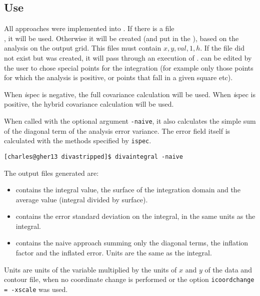 \subsection{Use}

All approaches were implemented into . If there is a file\\ 
, it will be used.
Otherwise it will be created (and put in the ), based on the analysis on the output grid. This files must contain $x,y,val,1,h$. If the file did not exist but was created, it will pass through an execution of . 
 can be edited by the user to chose special points for the integration (for example only those points for which the analysis is positive, or points that fall in a given square etc). 

When {\textit ispec } is negative, the full covariance calculation will be used. When {\textit ispec } is positive, the hybrid covariance calculation will be used.

When called with the optional argument \texttt{-naive}, it also calculates the simple sum of the diagonal term of the analysis error variance. The error field itself is calculated with the methods specified by \texttt{ispec}. 

\begin{lstlisting}[style=Bash]
[charles@gher13 divastripped]$ divaintegral -naive
\end{lstlisting}

The output files generated are:
\begin{itemize}
\item {} contains the integral value, the surface of the integration domain and the average value (integral divided by surface).
\item {} contains the error standard deviation on the integral, in the same units as the integral.
\item {} contains the naive approach summing only the diagonal terms, the inflation factor and the inflated error. Units are the same as the integral.
\end{itemize}

Units are units of the variable multiplied by the units of $x$ and $y$ of the data and contour file, when no coordinate change is performed or the option {\tt icoordchange = -xscale} was used.


